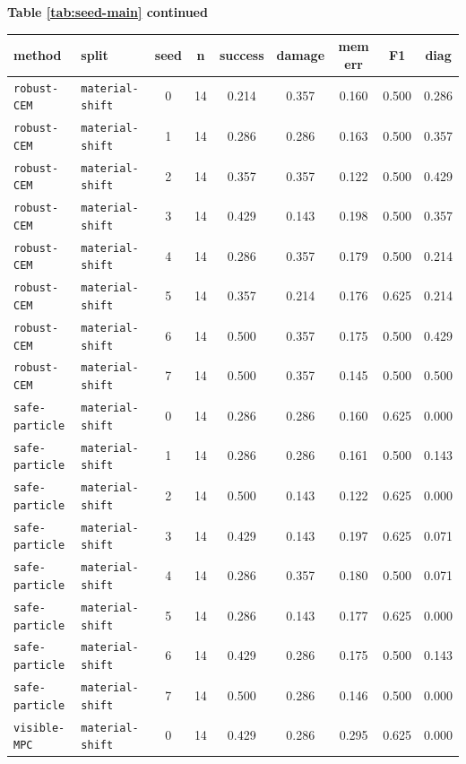 \documentclass{article}
\begin{document}
\begin{center}
\textbf{Table \ref{tab:seed-main} continued}\\[0.4ex]
\begin{tabular}{llccccccc}
\toprule
method & split & seed & n & success & damage & mem err & F1 & diag \\
\midrule
\texttt{robust-CEM} & \texttt{material-shift} & 0 & 14 & 0.214 & 0.357 & 0.160 & 0.500 & 0.286 \\
\texttt{robust-CEM} & \texttt{material-shift} & 1 & 14 & 0.286 & 0.286 & 0.163 & 0.500 & 0.357 \\
\texttt{robust-CEM} & \texttt{material-shift} & 2 & 14 & 0.357 & 0.357 & 0.122 & 0.500 & 0.429 \\
\texttt{robust-CEM} & \texttt{material-shift} & 3 & 14 & 0.429 & 0.143 & 0.198 & 0.500 & 0.357 \\
\texttt{robust-CEM} & \texttt{material-shift} & 4 & 14 & 0.286 & 0.357 & 0.179 & 0.500 & 0.214 \\
\texttt{robust-CEM} & \texttt{material-shift} & 5 & 14 & 0.357 & 0.214 & 0.176 & 0.625 & 0.214 \\
\texttt{robust-CEM} & \texttt{material-shift} & 6 & 14 & 0.500 & 0.357 & 0.175 & 0.500 & 0.429 \\
\texttt{robust-CEM} & \texttt{material-shift} & 7 & 14 & 0.500 & 0.357 & 0.145 & 0.500 & 0.500 \\
\texttt{safe-particle} & \texttt{material-shift} & 0 & 14 & 0.286 & 0.286 & 0.160 & 0.625 & 0.000 \\
\texttt{safe-particle} & \texttt{material-shift} & 1 & 14 & 0.286 & 0.286 & 0.161 & 0.500 & 0.143 \\
\texttt{safe-particle} & \texttt{material-shift} & 2 & 14 & 0.500 & 0.143 & 0.122 & 0.625 & 0.000 \\
\texttt{safe-particle} & \texttt{material-shift} & 3 & 14 & 0.429 & 0.143 & 0.197 & 0.625 & 0.071 \\
\texttt{safe-particle} & \texttt{material-shift} & 4 & 14 & 0.286 & 0.357 & 0.180 & 0.500 & 0.071 \\
\texttt{safe-particle} & \texttt{material-shift} & 5 & 14 & 0.286 & 0.143 & 0.177 & 0.625 & 0.000 \\
\texttt{safe-particle} & \texttt{material-shift} & 6 & 14 & 0.429 & 0.286 & 0.175 & 0.500 & 0.143 \\
\texttt{safe-particle} & \texttt{material-shift} & 7 & 14 & 0.500 & 0.286 & 0.146 & 0.500 & 0.000 \\
\texttt{visible-MPC} & \texttt{material-shift} & 0 & 14 & 0.429 & 0.286 & 0.295 & 0.625 & 0.000 \\

\end{tabular}
\end{center}
\end{document}
